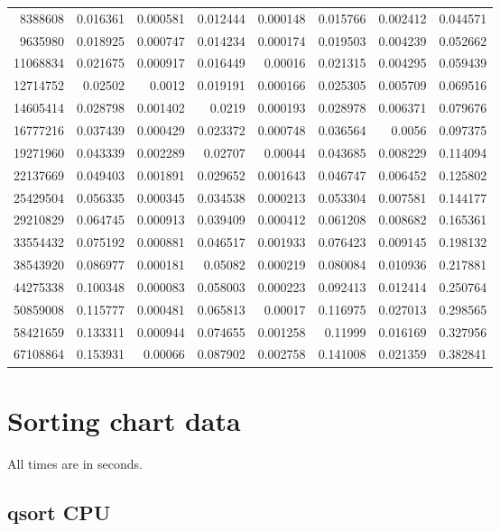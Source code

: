 \begin{longtable}{r r r r r r r r}
8388608 & 0.016361 & 0.000581 & 0.012444 & 0.000148 & 0.015766 & 0.002412 & 0.044571 \\
9635980 & 0.018925 & 0.000747 & 0.014234 & 0.000174 & 0.019503 & 0.004239 & 0.052662 \\
11068834 & 0.021675 & 0.000917 & 0.016449 & 0.00016 & 0.021315 & 0.004295 & 0.059439 \\
12714752 & 0.02502 & 0.0012 & 0.019191 & 0.000166 & 0.025305 & 0.005709 & 0.069516 \\
14605414 & 0.028798 & 0.001402 & 0.0219 & 0.000193 & 0.028978 & 0.006371 & 0.079676 \\
16777216 & 0.037439 & 0.000429 & 0.023372 & 0.000748 & 0.036564 & 0.0056 & 0.097375 \\
19271960 & 0.043339 & 0.002289 & 0.02707 & 0.00044 & 0.043685 & 0.008229 & 0.114094 \\
22137669 & 0.049403 & 0.001891 & 0.029652 & 0.001643 & 0.046747 & 0.006452 & 0.125802 \\
25429504 & 0.056335 & 0.000345 & 0.034538 & 0.000213 & 0.053304 & 0.007581 & 0.144177 \\
29210829 & 0.064745 & 0.000913 & 0.039409 & 0.000412 & 0.061208 & 0.008682 & 0.165361 \\
33554432 & 0.075192 & 0.000881 & 0.046517 & 0.001933 & 0.076423 & 0.009145 & 0.198132 \\
38543920 & 0.086977 & 0.000181 & 0.05082 & 0.000219 & 0.080084 & 0.010936 & 0.217881 \\
44275338 & 0.100348 & 0.000083 & 0.058003 & 0.000223 & 0.092413 & 0.012414 & 0.250764 \\
50859008 & 0.115777 & 0.000481 & 0.065813 & 0.00017 & 0.116975 & 0.027013 & 0.298565 \\
58421659 & 0.133311 & 0.000944 & 0.074655 & 0.001258 & 0.11999 & 0.016169 & 0.327956 \\
67108864 & 0.153931 & 0.00066 & 0.087902 & 0.002758 & 0.141008 & 0.021359 & 0.382841 \\
\end{longtable}

\section{Sorting chart data}
\label{sec:sort_chart_data}

All times are in seconds.

\subsection*{qsort CPU}

